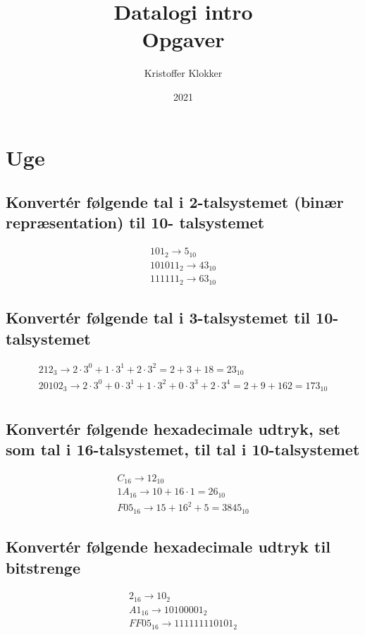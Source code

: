 \documentclass[12pt, a4paper]{article}
\title{Datalogi intro\\Opgaver}
\date{2021}
\author{Kristoffer Klokker}
\begin{document}
	\maketitle
	\clearpage
	\tableofcontents
	\clearpage
		\setcounter{section}{35}
		\section{Uge}
			\subsection{Konvertér følgende tal i 2-talsystemet (binær repræsentation) til 10-
			talsystemet}
			\begin{align*}
				101_2 \rightarrow 5_{10}\\
				101011_2 \rightarrow 43_{10}\\
				111111_2 \rightarrow 63_{10}
			\end{align*}
			\subsection{Konvertér følgende tal i 3-talsystemet til 10-talsystemet}
			\begin{align*}
				212_3\rightarrow 2\cdot 3^0+1\cdot 3^1+2\cdot 3^2 = 2+3+18=23_{10}\\ 
				20102_3\rightarrow 2\cdot 3^0+0\cdot 3^1+1\cdot 3^2+0\cdot3^3+2\cdot 3^4=2+9+162=173_{10}\\
			\end{align*}
			\subsection{Konvertér følgende hexadecimale udtryk, set som tal i 16-talsystemet, til tal i 10-talsystemet}
			\begin{align*}
				C_{16} \rightarrow 12_{10}\\
				1A_{16} \rightarrow 10+16\cdot 1 = 26_{10}\\
				F05_{16} \rightarrow 15+16^2 + 5 =3845_{10}
			\end{align*}
			\subsection{Konvertér følgende hexadecimale udtryk til bitstrenge}
			\begin{align*}
				2_{16} \rightarrow 10_2\\
				A1_{16} \rightarrow 10100001_2\\
				FF05_{16} \rightarrow 111111110101_2\\
			\end{align*}
\end{document}
